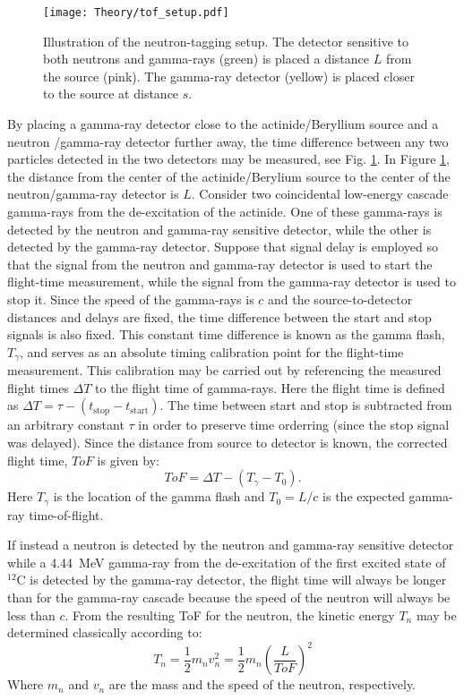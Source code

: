 \documentclass[main.tex]{subfiles}
\begin{document}
\begin{figure}[t]
    \centering
        \texttt{[image: Theory/tof\_setup.pdf]}
        \caption[Illustration of the neutron-tagging setup]{Illustration of the neutron-tagging setup. The detector sensitive to both neutrons and gamma-rays (green) is placed a distance $L$ from the source (pink). The gamma-ray detector (yellow) is placed closer to the source at distance $s$. }
    \label{fig:tof_setup} 
\end{figure}

By placing a gamma-ray detector close to the actinide/Beryllium source and a neutron /gamma-ray detector further away, the time difference between any two particles detected in the two detectors may be measured, see Fig. \ref{fig:tof_setup}. 
In Figure \ref{fig:tof_setup}, the distance from the center of the actinide/Berylium source to the center of the neutron/gamma-ray detector is $L$. Consider two coincidental low-energy cascade gamma-rays from the de-excitation of the actinide. One of these gamma-rays is detected by the neutron and gamma-ray sensitive detector, while the other is detected by the gamma-ray detector. Suppose that signal delay is employed so that the signal from the neutron and gamma-ray detector is used to start the flight-time measurement, while the signal from the gamma-ray detector is used to stop it. Since the speed of the gamma-rays is $c$ and the source-to-detector distances and delays are fixed, the time difference between the start and stop signals is also fixed. This constant time difference is known as the gamma flash, $T_\gamma$, and serves as an absolute timing calibration point for the flight-time measurement. This calibration may be carried out by referencing the measured flight times $\Delta T$ to the flight time of gamma-rays. Here the flight time is defined as $\Delta T=\tau -(t_{\textrm{stop}}-t_{\textrm{start}})$. The time between start and stop is subtracted from an arbitrary constant $\tau$ in order to preserve time orderring (since the stop signal was delayed). Since the distance from source to detector is known, the corrected flight time, $ToF$ is given by:
\begin{equation}
	ToF = \Delta T -(T_\gamma - T_0).
	\label{eq:tof_cal}
\end{equation}
Here $T_\gamma$ is the location of the gamma flash and $T_0=L/c$ is the expected gamma-ray time-of-flight.

If instead a neutron is detected by the neutron and gamma-ray sensitive detector while a \SI{4.44}{\MeV} gamma-ray from the de-excitation of the first excited state of $^\textrm{12}$C is detected by the gamma-ray detector, the flight time will always be longer than for the gamma-ray cascade because the speed of the neutron will always be less than $c$. From the resulting ToF for the neutron, the kinetic energy $T_n$ may be determined classically according to:
\begin{equation}
	T_n = \frac{1}{2} m_n v_n^2 = \frac{1}{2}m_n\left(\frac{L}{ToF}\right)^2
	\label{eq:Tn}
\end{equation}
Where $m_n$ and $v_n$ are the mass and the speed of the neutron, respectively.
\end{document}
